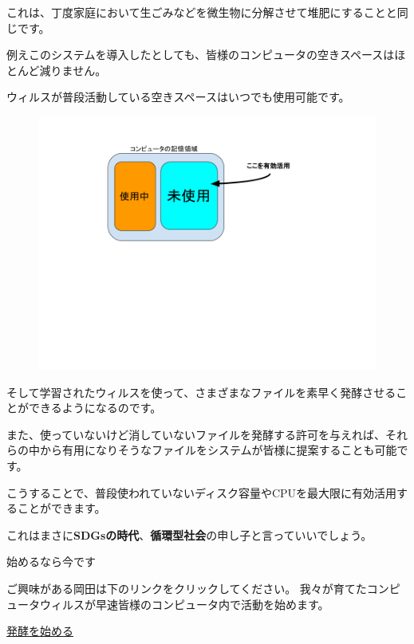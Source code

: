 \documentclass[12pt, unicode]{beamer}
\begin{document}
\begin{frame}

\vspace{1\baselineskip}

これは、丁度家庭において生ごみなどを微生物に分解させて堆肥にすることと同じです。

例えこのシステムを導入したとしても、皆様のコンピュータの空きスペースはほとんど減りません。

ウィルスが普段活動している空きスペースはいつでも使用可能です。

\begin{figure}[htbp]
  \begin{minipage}[b]{0.8\linewidth}
    \centering
    \includegraphics[keepaspectratio, scale=0.3]{fig1.png}
  \end{minipage}
\end{figure}

\end{frame}

\begin{frame}

そして学習されたウィルスを使って、さまざまなファイルを素早く発酵させることができるようになるのです。

また、使っていないけど消していないファイルを発酵する許可を与えれば、それらの中から有用になりそうなファイルをシステムが皆様に提案することも可能です。

\end{frame}

\begin{frame}

こうすることで、普段使われていないディスク容量やCPUを最大限に有効活用することができます。

これはまさに\textbf{SDGsの時代}、\textbf{循環型社会}の申し子と言っていいでしょう。

\end{frame}

\begin{frame}{始めるなら今です}

ご興味がある岡田は下のリンクをクリックしてください。
我々が育てたコンピュータウィルスが早速皆様のコンピュータ内で活動を始めます。

{\color{blue}
\href{https://github.com/tannakaken/DataFermentation/releases/download/1.0.0/main.pdf}{\underline{発酵を始める}}
}

\end{frame}
\end{document}
